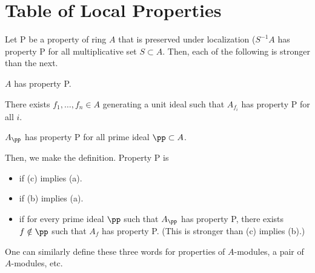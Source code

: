\chapter{Table of Local Properties}
\newcommand{\entry}[2]{\begin{tabular}{c}
#1 \\ \footnotesize #2 \end{tabular}}
\begin{definition}
    Let P be a property of ring $A$ that is preserved 
    under localization ($S^{-1}A$ has property P
    for all multiplicative set $S\subset A$.
    Then, each of the following is stronger than the next.
    \begin{alphenum}
    \item $A$ has property P.
    \item There exists $f_1,\dots,f_n\in A$ generating a unit ideal such that $A_{f_i}$ has property P for all $i$.
    \item $A_\pp$ has property P for all prime ideal 
    $\pp\subset A$.
    \end{alphenum}
    Then, we make the definition. Property P is
    \begin{itemize}
    \item {}
    if (c) implies (a).
    \item {} if (b) implies (a).
    \item {} if for every prime ideal $\pp$ such that $A_\pp$ has property P,
    there exists $f\notin\pp$ such that $A_f$ has property P.
    (This is stronger than (c) implies (b).)
    \end{itemize}
\end{definition}
One can similarly define these three words for properties of 
$A$-modules, a pair of $A$-modules, etc.

